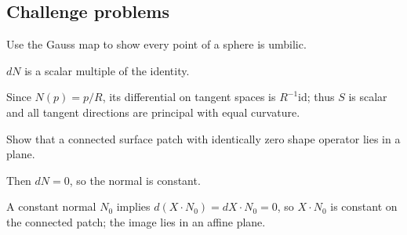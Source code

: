 \subsection*{Challenge problems}

\begin{exercise}\label{exr:vii16-ped-15}
Use the Gauss map to show every point of a sphere is umbilic.
\end{exercise}
\begin{hint}
\(dN\) is a scalar multiple of the identity.
\end{hint}
\begin{solution}
Since \(N(p)=p/R\), its differential on tangent spaces is \(R^{-1}\mathrm{id}\); thus \(S\) is scalar and all tangent directions are principal with equal curvature.
\end{solution}

\begin{exercise}\label{exr:vii16-ped-16}
Show that a connected surface patch with identically zero shape operator lies in a plane.
\end{exercise}
\begin{hint}
Then \(dN=0\), so the normal is constant.
\end{hint}
\begin{solution}
A constant normal \(N_0\) implies \(d(X\cdot N_0)=dX\cdot N_0=0\), so \(X\cdot N_0\) is constant on the connected patch; the image lies in an affine plane.
\end{solution}

